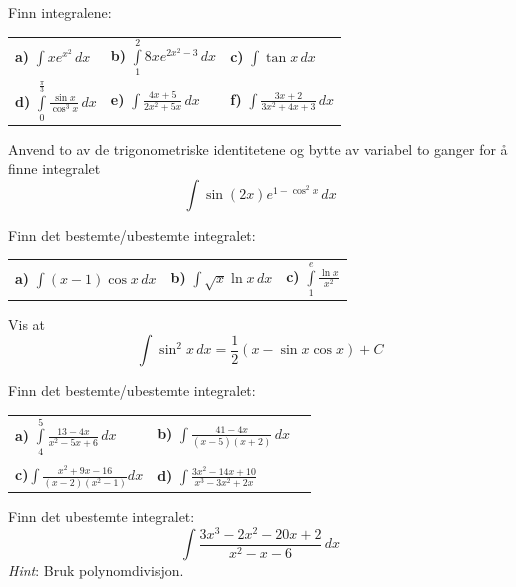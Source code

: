 Finn integralene:\os

\begin{tabular}{@{}l l l}	
\textbf{a)} $\displaystyle \int xe^{x^2} \, dx  $ &\;\textbf{b)} $\displaystyle \int\limits_1^2 8xe^{2x^2-3}\,dx $ &\;\textbf{c)} $\displaystyle \int \tan x \, dx $ \\ \vspace{3pt} 
\textbf{d)} $ \displaystyle \int\limits_0^\frac{\pi}{3}\frac{\sin x}{\cos^3 x} \, dx $ &\;\textbf{e)} $ \displaystyle \int \frac{4x+5}{2x^2 + 5x}\,dx $
&\;\textbf{f)} $ \displaystyle \int \frac{3x+2}{3x^2 + 4x+3}\,dx $
\end{tabular} 

Anvend to av de trigonometriske identitetene og bytte av variabel to ganger for å finne integralet
\[ \int \sin (2x) e^{1-\cos^2 x}\,dx \]\vs


Finn det bestemte/ubestemte integralet:\os
\begin{tabular}{@{}l l l}	
	\textbf{a)} $\displaystyle \int (x-1)\cos x \, dx$&\quad	\textbf{b)} $\displaystyle \int \sqrt{x}\ln x\,dx $ &\quad\textbf{c)} $\displaystyle \int\limits_1^e  \frac{\ln x}{x^2} $ 
\end{tabular}

Vis at
\[ \int \sin^2 x\,dx=\frac{1}{2}(x-\sin x \cos x)+C \]\vs

Finn det bestemte/ubestemte integralet:\os

\begin{tabular}{@{}l l l}	
	\textbf{a)} $ \displaystyle \int\limits_4^5 \frac{13-4x}{x^2-5x+6}\,dx $	&\quad \textbf{b)} $ \displaystyle \int \frac{41 - 4 x}{(x - 5) (x + 2)}\, dx $ \\ \\
	\textbf{c)}$\displaystyle \int\limits \frac{x^2+9x-16}{(x-2)(x^2-1)} dx$  &\quad \textbf{d)} $ \displaystyle \int\frac{3 x^2 - 14 x + 10}{x^3 - 3 x^2 + 2 x} $
\end{tabular}

Finn det ubestemte integralet:
\[\int \frac{3 x^3 - 2 x^2 - 20 x + 2}{x^2-x-6}\,dx \]
\textsl{Hint}: Bruk polynomdivisjon.

